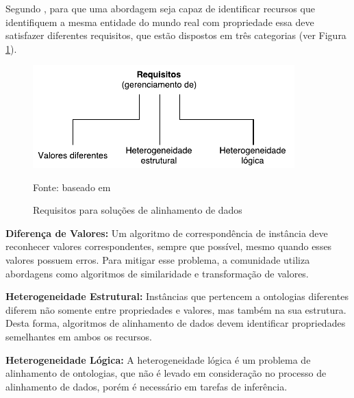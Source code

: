Segundo , para que uma abordagem seja capaz de identificar recursos que identifiquem a mesma entidade do mundo real com propriedade essa deve satisfazer diferentes requisitos, que estão  dispostos em três categorias (ver Figura \ref{fig:imrequirements}).

\begin{figure}[!ht]
	\centering
	\includegraphics[width=0.9\textwidth]{./imagens/im_requirements.pdf}
    \caption{Requisitos para soluções de alinhamento de dados}
	\footnotesize{Fonte: baseado em \cite{ferrara2008towards}}
	\label{fig:imrequirements}
\end{figure}

\textbf{Diferença de Valores:}
Um algoritmo de correspondência de instância deve reconhecer valores correspondentes, sempre que possível, mesmo quando esses valores possuem erros. Para mitigar esse problema, a comunidade utiliza abordagens como algoritmos de similaridade e transformação de valores.


\textbf{Heterogeneidade Estrutural:}
Instâncias que pertencem a ontologias diferentes diferem não somente entre propriedades e valores, mas também na sua estrutura. Desta forma, algoritmos de alinhamento de dados devem identificar propriedades semelhantes em ambos os recursos.


\textbf{Heterogeneidade Lógica:}
A heterogeneidade lógica é um problema de alinhamento de ontologias, que não é levado em consideração no processo de alinhamento de dados, porém é necessário em tarefas de inferência.

